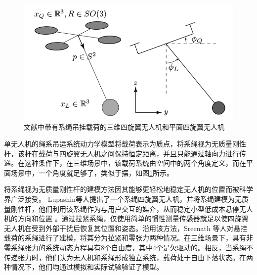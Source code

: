 \documentclass[lang=chs, degree=master, blindreview=true, winfonts=true]{yanputhesis}
\begin{document}
\begin{figure}[hbt!]
	\centering
	\includegraphics[width=28pc]{picture/1_1.png} 
	\caption{文献中带有系绳吊挂载荷的三维四旋翼无人机和平面四旋翼无人机} \label{1_1}
\end{figure}
单无人机的绳系吊运系统动力学模型将载荷表示为质点，将系绳视为无质量刚性杆，该杆在载荷与四旋翼无人机之间保持恒定距离，并且只能通过轴向力进行传递。在这种条件下，在三维场景中，该载荷系统由空间中的两个角度定义，而在平面场景中，一个角度就足够了，类似于摆\cite{sun2021novel}，如图\ref{1_1}所示。

将系绳视为无质量刚性杆的建模方法因其能够更轻松地稳定无人机的位置而被科学界广泛接受。
Lupashin等人\cite{lupashin2013stabilization}提出了一个系绳四旋翼无人机，并将系绳建模为无质量刚性杆，他们利用该系绳作为与用户交互的媒介，从而稳定小型低成本悬停无人机的方向和位置  。通过拉紧系绳，仅使用简单的惯性测量传感器就足以使四旋翼无人机在受到外部干扰后恢复其位置和姿态。沿用该方法，Sreenath 等人\cite{sreenath2013trajectory}对悬挂载荷的系绳进行了建模，将其分为拉紧和零张力两种情况。在三维场景下，具有非零系绳张力的系统动态方程具有8个自由度，其中4个是欠驱动的。相反，当系绳不传递张力时，他们认为无人机和系绳形成独立系统，载荷处于自由下落状态。在两种情况下，他们均通过模拟和实际试验验证了模型。
\end{document}
